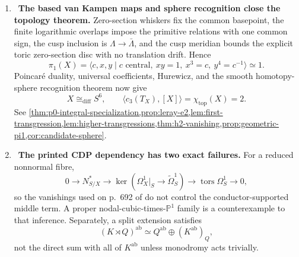 \begin{enumerate}[leftmargin=1.8em,itemsep=.65em]
\item \Verified\ \textbf{The based van Kampen maps and sphere recognition
close the topology theorem.}
Zero-section whiskers fix the common basepoint, the finite logarithmic
overlaps impose the primitive relations with one common sign, the cusp
inclusion is \(\Lambda\to\bar\Lambda\), and the cusp meridian bounds the
explicit toric zero-section disc with no translation drift.  Hence
\[
\pi_1(X)=
\langle c,x,y\mid c\text{ central},\ xy=1,\ x^3=c,\ y^4=c^{-1}\rangle
\simeq1.
\]
Poincar\'e duality, universal coefficients, Hurewicz, and the smooth
homotopy-sphere recognition theorem now give
\[
 X\cong_{\mathrm{diff}}S^6,\qquad
 \langle c_3(T_X),[X]\rangle=\chi_{\mathrm{top}}(X)=2.
\]
See
\cref{thm:p0-integral-specialization,prop:leray-e2,lem:first-transgression,lem:higher-transgressions,thm:h2-vanishing,prop:geometric-pi1,cor:candidate-sphere}.

\item \Refuted\ \textbf{The printed CDP dependency has two exact failures.}
For a reduced nonnormal fibre,
\[
0\longrightarrow N^*_{S/X}\longrightarrow
\ker(\Omega_X^1|_S\to\widetilde\Omega_S^1)
\longrightarrow\operatorname{tors}\Omega_S^1\longrightarrow0,
\]
so the vanishings used on p.~692 of \cite{CDP2020} do not control the
conductor-supported middle term.  A proper
nodal-cubic-times-\(\mathbb P^1\) family is a counterexample to that
inference.  Separately, a split extension satisfies
\[
 (K\rtimes Q)^{\mathrm{ab}}
 \simeq Q^{\mathrm{ab}}\oplus(K^{\mathrm{ab}})_Q,
\]
not the direct sum with all of \(K^{\mathrm{ab}}\) unless monodromy acts
trivially.


\end{enumerate}
